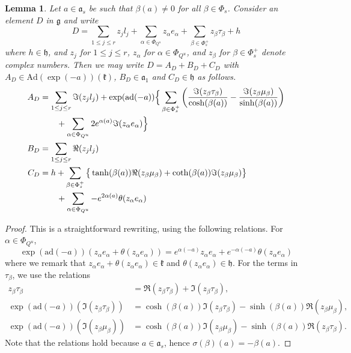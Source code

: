 \documentclass{amsart}
\newtheorem{lem}[thm]{Lemma}
\theoremstyle{definition}
\begin{document}
\begin{lem}
\label{lem_prep1}
Let $a\in \mathfrak{a}_s$ be such that $\beta(a)\neq 0$ for all 
$\beta \in \Phi_s$.
Consider an element $D$ in $\mathfrak{g}$ and write 
\[
D = \sum_{1\leq j\leq r}z_jl_j + \sum_{\alpha\in \Phi_{Q^u}}z_{\alpha}e_{\alpha}
+\sum_{\beta \in \Phi_s^+}z_{\beta}\tau_{\beta}
+h
\] 
where $h\in \mathfrak{h}$, and $z_j$ for $1\leq j\leq r$, 
$z_{\alpha}$ for $\alpha\in \Phi_{Q^u}$, and 
$z_{\beta}$ for $\beta \in \Phi_s^+$ denote 
complex numbers.
Then we may write 
$D=A_D+B_D+C_D$ with $A_D\in \mathrm{Ad}(\exp(-a))(\mathfrak{k})$, 
$B_D \in \mathfrak{a}_1$ and $C_D\in \mathfrak{h}$ as follows.
\begin{align*}
A_D & = \sum_{1\leq j\leq r} \Im(z_jl_j) + \exp(\mathrm{ad}(-a)) \Big{\{} 
\sum_{\beta \in \Phi_s^+}
			\left( \frac{\Im(z_{\beta}\tau_{\beta})}{\cosh(\beta(a))} -
			\frac{\Im(z_{\beta}\mu_{\beta})}{\sinh(\beta(a))} \right)
\\ & \qquad 
+  \sum_{\alpha\in\Phi_{Q^u}} 2e^{\alpha(a)} \Im(z_{\alpha}e_{\alpha})  \Big{\}}
			\\
B_D & = \sum_{1\leq j\leq r}\Re(z_jl_j)  \\
C_D & = h  + 
		\sum_{\beta \in \Phi_s^+} \big{\{}
		\tanh(\beta(a))\Re(z_{\beta}\mu_{\beta})+ \coth(\beta(a))\Im(z_{\beta}\mu_{\beta}) \big{\}}
\\ & \qquad
		 +\sum_{\alpha\in \Phi_{Q^u}}-e^{2\alpha(a)}\theta(z_{\alpha}e_{\alpha})
\end{align*}
\end{lem}

\begin{proof}
This is a straightforward rewriting, using the following relations.
For $\alpha\in \Phi_{Q^u}$, 
\[
\exp(\mathrm{ad}(-a))(z_{\alpha}e_{\alpha} + \theta(z_{\alpha}e_{\alpha})) = 
e^{\alpha(-a)}z_{\alpha}e_{\alpha} + e^{-\alpha(-a)}\theta(z_{\alpha}e_{\alpha})
\] 
where we remark that 
$z_{\alpha}e_{\alpha} + \theta(z_{\alpha}e_{\alpha})\in \mathfrak{k}$
and 
$\theta(z_{\alpha}e_{\alpha})\in \mathfrak{h}$. 
For the terms in $\tau_{\beta}$, we use the relations 
\begin{align*}
z_{\beta}\tau_{\beta} & = \Re(z_{\beta}\tau_{\beta}) + \Im(z_{\beta}\tau_{\beta}), \\
\exp(\mathrm{ad}(-a))(\Im(z_{\beta}\tau_{\beta}))  
& = 
\cosh(\beta(a))\Im(z_{\beta}\tau_{\beta}) - 
\sinh(\beta(a))\Re(z_{\beta}\mu_{\beta}),  \\
\exp(\mathrm{ad}(-a))(\Im(z_{\beta}\mu_{\beta}))  
& = 
\cosh(\beta(a))\Im(z_{\beta}\mu_{\beta}) - 
\sinh(\beta(a))\Re(z_{\beta}\tau_{\beta}). 
\end{align*}
Note that the relations hold because $a\in \mathfrak{a}_s$, hence 
$\sigma(\beta)(a)=-\beta(a)$. 
\end{proof}
\end{document}
